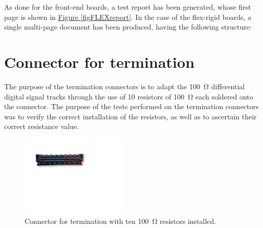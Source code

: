 \par
As done for the front-end boards, a test report has been generated, whose first page is shown in \hyperref[figFLEXreport]{Figure \ref{figFLEXreport}}. In the case of the flex-rigid boards, a single multi-page document has been produced, having the following structure:

\begin{table}[h!]
    \centering
    \def\arraystretch{2}
    \caption{Structure of the entry for the flex-rigid boards test report.}
    \label{tabFLEXstruct}
\end{table}



\section{Connector for termination}

The purpose of the termination connectors is to adapt the \SI{100}{\ohm} differential digital signal tracks through the use of 10 resistors of \SI{100}{\ohm} each soldered onto the connector. The purpose of the tests performed on the termination connectors was to verify the correct installation of the resistors, as well as to ascertain their correct resistance value.

\begin{figure}[ht]
    \centering
    \includegraphics[width=0.45\textwidth]{Images/chap2/term_conn.pdf}
    \caption{Connector for termination with ten \SI{100}{\ohm} resistors installed.}
    \label{figTermConnector}
\end{figure}

